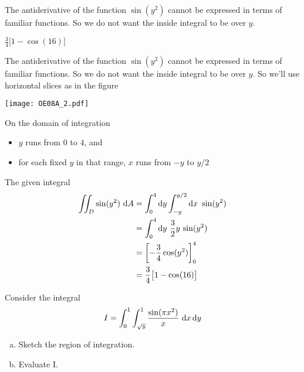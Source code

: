 \begin{hint}
The antiderivative of the function $\sin(y^2)$ cannot be expressed
in terms of familiar functions. So we do not want the inside integral to 
be over $y$.
\end{hint}

\begin{answer}
$\frac{3}{4}\big[1-\cos(16)\big]$
\end{answer}

\begin{solution}
The antiderivative of the function $\sin(y^2)$ cannot be expressed
in terms of familiar functions. So we do not want the inside integral to 
be over $y$. So we'll use horizontal slices as in the figure

\begin{center}
     \texttt{[image: OE08A\_2.pdf]}
\end{center}
  
On the domain of integration
\begin{itemize}
\item
   $y$ runs from $0$ to $4$, and
\item
   for each fixed $y$ in that range, $x$ runs from $-y$ to $y/2$
\end{itemize}
The given integral
\begin{align*}
\iint_D \sin(y^2)\ \mathrm{d}A
&=\int_0^4\mathrm{d}y\int_{-y}^{y/2}\mathrm{d}x\ \sin(y^2) \\
&=\int_0^4 \mathrm{d}y\ \frac{3}{2}y\,\sin(y^2) \\
&=\left[-\frac{3}{4}\cos(y^2)\right]_0^4 \\
&=\frac{3}{4}\big[1-\cos(16)\big]
\end{align*}

\end{solution}

\begin{question}[M200 2008D] %
Consider the integral
\begin{equation*}
I = \int_0^1 \int_{\sqrt{y}}^1 \frac{\sin(\pi x^2)}{x}\ \mathrm{d}x\,\mathrm{d}y
\end{equation*}

\begin{enumerate}[(a)]
\item
Sketch the region of integration.
\item 
Evaluate I.

\end{enumerate}
\end{question}

